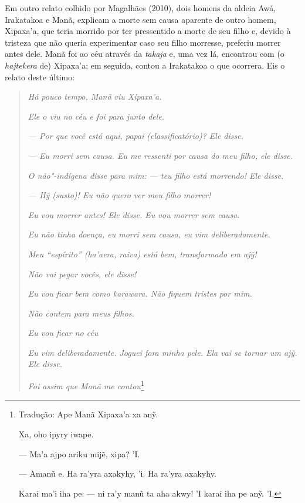 Em outro relato colhido por Magalhães (2010), dois homens da aldeia
Awá, Irakatakoa e Manã, explicam a morte sem causa aparente de
outro homem, Xipaxa'a, que teria morrido por ter pressentido a morte de
seu filho e, devido à tristeza que não queria experimentar caso seu
filho morresse, preferiu morrer antes dele. Manã foi ao céu através da
\emph{takaja} e, uma vez lá, encontrou com (o \emph{hajtekera} de)
Xipaxa'a; em seguida, contou a Irakatakoa o que ocorrera. Eis o relato
deste último:

\begin{quote}
\emph{Há pouco tempo, Manã viu Xipaxa'a.}

\noindent\emph{Ele o viu no céu e foi para junto dele.}

\noindent\emph{--- Por que você está aqui, papai (classificatório)? Ele disse.}

\noindent\emph{--- Eu morri sem causa. Eu me ressenti por causa do meu filho, ele disse.}

\noindent\emph{O não"-indígena disse para mim: --- teu filho está morrendo! Ele disse.}

\noindent\emph{--- \emph{Hy}̃ (susto)! Eu não quero ver meu filho morrer!}

\noindent\emph{Eu vou morrer antes! Ele disse. Eu vou morrer sem causa.}

\noindent\emph{Eu não tinha doença, eu morri sem causa, eu vim deliberadamente.}

\noindent\emph{Meu ``espírito'' (\emph{ha'aera}, \emph{raiva}) está bem, transformado em
ajỹ!}

\noindent\emph{Não vai pegar vocês, ele disse!}

\noindent\emph{Eu vou ficar bem como \emph{karawara}. Não fiquem tristes por mim.}

\noindent\emph{Não contem para meus filhos.}

\noindent\emph{Eu vou ficar no céu}

\noindent\emph{Eu vim deliberadamente. Joguei fora minha pele. Ela vai se tornar um
\noindent\emph{ajỹ}. Ele disse.}

\noindent\emph{Foi assim que Manã me contou}\footnote{Tradução: Ape Manã Xipaxa'a xa
  anỹ.

  Xa, oho ipyry iwape.

  --- Ma'a ajpo ariku mijẽ, xipa? 'I.

  --- Amanũ e. Ha ra'yra axakyhy, 'i. Ha ra'yra axakyhy.

  Karai ma'i iha pe: --- ni ra'y manũ ta aha akwy! 'I karai iha pe anỹ.
  'I.

}
\end{quote}
